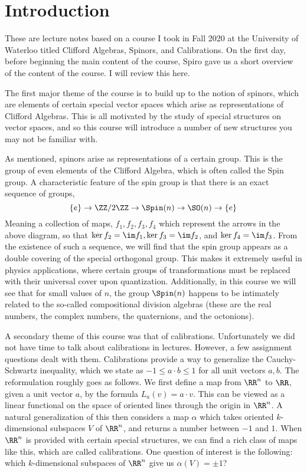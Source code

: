\section*{Introduction} 

These are lecture notes based on a course I took in Fall 2020 at the University of Waterloo titled Clifford Algebras, Spinors, and Calibrations. On the first day, before beginning the main content of the course, Spiro gave us a short overview of the content of the course. I will review this here.

The first major theme of the course is to build up to the notion of spinors, which are elements of certain special vector spaces which arise as representations of Clifford Algebras. This is all motivated by the study of special structures on vector spaces, and so this course will introduce a number of new structures you may not be familiar with. 

As mentioned, spinors arise as representations of a certain group. This is the group of even elements of the Clifford Algebra, which is often called the Spin group. A characteristic feature of the spin group is that there is an exact sequence of groups,
\[\{e\} \to \ZZ/2\ZZ \to \Spin(n) \to \SO(n) \to \{e\}\]
Meaning a collection of maps, $f_1,f_2,f_3,f_4$ which represent the arrows in the above diagram, so that $\ker f_2 = \im f_1, \ker f_3 = \im f_2$, and $\ker f_4 = \im f_3$. From the existence of such a sequence, we will find that the spin group appears as a double covering of the special orthogonal group. This makes it extremely useful in physics applications, where certain groups of transformations must be replaced with their universal cover upon quantization. Additionally, in this course we will see that for small values of $n$, the group $\Spin(n)$ happens to be intimately related to the so-called compositional division algebras (these are the real numbers,  the complex numbers, the quaternions, and the octonions).

A secondary theme of this course was that of calibrations. Unfortunately we did not have time to talk about calibrations in lectures. However, a few assignment questions dealt with them. Calibrations provide a way to generalize the Cauchy-Schwartz inequality, which we state as $-1\leq a\cdot b\leq 1$ for all unit vectors $a,b$. The reformulation roughly goes as follows. We first define a map from $\RR^n$ to $\RR$, given a unit vector $a$, by the formula $L_a(v) = a\cdot v$. This can be viewed as a linear functional on the space of oriented lines through the origin in $\RR^n$. A natural generalization of this then considers a map $\alpha$ which takes oriented $k$-dimensional subspaces $V$ of $\RR^n$, and returns a number between $-1$ and $1$. When $\RR^n$ is provided with certain special structures, we can find a rich class of maps like this, which are called calibrations. One question of interest is the following: which $k$-dimensional subspaces of $\RR^n$ give us $\alpha(V) = \pm 1$? 

